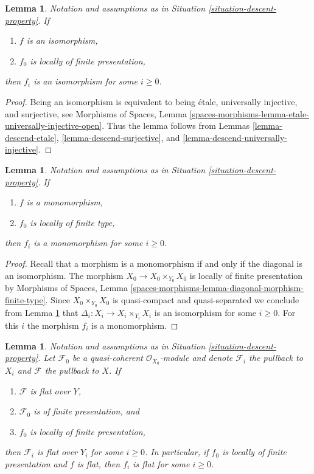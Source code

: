 \documentclass{stacks-project}
\theoremstyle{plain}
\newtheorem{lemma}[subsection]{Lemma}
\theoremstyle{definition}
\theoremstyle{remark}
\numberwithin{equation}{subsection}
\begin{document}
\begin{lemma}
\label{lemma-descend-isomorphism}
Notation and assumptions as in Situation \ref{situation-descent-property}. If
\begin{enumerate}
\item $f$ is an isomorphism,
\item $f_0$ is locally of finite presentation,
\end{enumerate}
then $f_i$ is an isomorphism for some $i \geq 0$.
\end{lemma}

\begin{proof}
Being an isomorphism is equivalent to being \'etale, universally injective,
and surjective, see
Morphisms of Spaces, Lemma
\ref{spaces-morphisms-lemma-etale-universally-injective-open}.
Thus the lemma follows from
Lemmas \ref{lemma-descend-etale},
\ref{lemma-descend-surjective}, and
\ref{lemma-descend-universally-injective}.
\end{proof}

\begin{lemma}
\label{lemma-descend-monomorphism}
Notation and assumptions as in Situation \ref{situation-descent-property}. If
\begin{enumerate}
\item $f$ is a monomorphism,
\item $f_0$ is locally of finite type,
\end{enumerate}
then $f_i$ is a monomorphism for some $i \geq 0$.
\end{lemma}

\begin{proof}
Recall that a morphism is a monomorphism if and only if the diagonal is
an isomorphism. The morphism $X_0 \to X_0 \times_{Y_0} X_0$ is locally of
finite presentation by
Morphisms of Spaces, Lemma
\ref{spaces-morphisms-lemma-diagonal-morphism-finite-type}.
Since $X_0 \times_{Y_0} X_0$ is quasi-compact and quasi-separated
we conclude from
Lemma \ref{lemma-descend-isomorphism}
that $\Delta_i : X_i \to X_i \times_{Y_i} X_i$ is an isomorphism for
some $i \geq 0$. For this $i$ the morphism $f_i$ is a monomorphism.
\end{proof}

\begin{lemma}
\label{lemma-descend-flat}
Notation and assumptions as in Situation \ref{situation-descent-property}.
Let $\mathcal{F}_0$ be a quasi-coherent $\mathcal{O}_{X_0}$-module
and denote $\mathcal{F}_i$ the pullback to $X_i$ and $\mathcal{F}$
the pullback to $X$. If
\begin{enumerate}
\item $\mathcal{F}$ is flat over $Y$,
\item $\mathcal{F}_0$ is of finite presentation, and
\item $f_0$ is locally of finite presentation,
\end{enumerate}
then $\mathcal{F}_i$ is flat over $Y_i$ for some $i \geq 0$.
In particular, if $f_0$ is locally of finite presentation and
$f$ is flat, then $f_i$ is flat for some $i \geq 0$.
\end{lemma}
\end{document}
